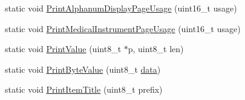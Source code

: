 \begin{DoxyCompactItemize}
\item 
static void \hyperlink{class_report_desc_parser_base_af2d133ba2b6b7d5ac3c0db3ffac531d0}{\-Print\-Alphanum\-Display\-Page\-Usage} (uint16\-\_\-t usage)
\item 
static void \hyperlink{class_report_desc_parser_base_a17e7613faa695c5d654f1cd6d9262cf4}{\-Print\-Medical\-Instrument\-Page\-Usage} (uint16\-\_\-t usage)
\item 
static void \hyperlink{class_report_desc_parser_base_a3c160efea3854223f0e171a9d97a07cd}{\-Print\-Value} (uint8\-\_\-t $\ast$p, uint8\-\_\-t len)
\item 
static void \hyperlink{class_report_desc_parser_base_a1af970b456e54342e15a88ffd98ca6cc}{\-Print\-Byte\-Value} (uint8\-\_\-t \hyperlink{masstorage_8h_afb87d045bbf32b236fc425efe02bdc7b}{data})
\item 
static void \hyperlink{class_report_desc_parser_base_aef5ef3133e573ff3bdcc7861e8ebc921}{\-Print\-Item\-Title} (uint8\-\_\-t prefix)
\end{DoxyCompactItemize}
